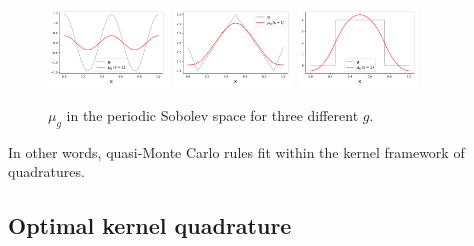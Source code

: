 \documentclass[twoside,11pt]{book}
\numberwithin{theorem}{chapter}
\numberwithin{definition}{chapter}
\numberwithin{proposition}{chapter}
\numberwithin{corollary}{chapter}
\numberwithin{example}{chapter}
\numberwithin{lemma}{chapter}
\begin{document}
\begin{figure}[]
    \centering
\includegraphics[width= 0.28\textwidth]{img/mean_element/Sobolev/mean_element_cos_ko_1.pdf}~\includegraphics[width= 0.28\textwidth]{img/mean_element/Sobolev/mean_element_saw_ko_1.pdf}~\includegraphics[width= 0.28\textwidth]{img/mean_element/Sobolev/mean_element_step_ko_1.pdf}\\
\caption{$\mu_{g}$ in the periodic Sobolev space for three different $g$.
\label{fig:mean_element}}
\end{figure}


In other words, quasi-Monte Carlo rules fit within the kernel framework of quadratures. 










\subsection{Optimal kernel quadrature}
\label{subsec:okq_analysis_paradigm}
\end{document}
